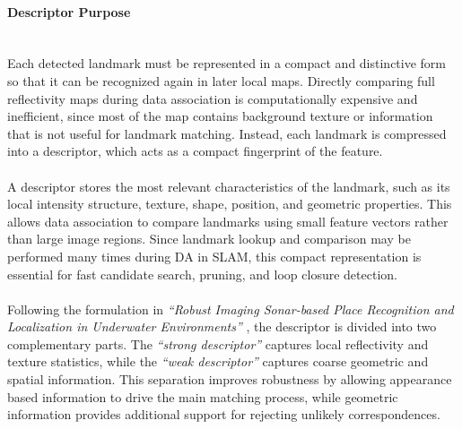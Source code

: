 \paragraph{Descriptor Purpose} \mbox{}\\[0.5em] \noindent
Each detected landmark must be represented in a compact and distinctive form so that it can be recognized again in later local maps. Directly comparing full reflectivity maps during data association is computationally expensive and inefficient, since most of the map contains background texture or information that is not useful for landmark matching. Instead, each landmark is compressed into a descriptor, which acts as a compact fingerprint of the feature.
\\ \\
A descriptor stores the most relevant characteristics of the landmark, such as its local intensity structure, texture, shape, position, and geometric properties. This allows data association to compare landmarks using small feature vectors rather than large image regions. Since landmark lookup and comparison may be performed many times during DA in SLAM, this compact representation is essential for fast candidate search, pruning, and loop closure detection.
\\ \\
Following the formulation in \textit{``Robust Imaging Sonar-based Place Recognition and Localization in Underwater Environments''} \cite{robust_descriptors}, the descriptor is divided into two complementary parts. The \textit{``strong descriptor''} captures local reflectivity and texture statistics, while the \textit{``weak descriptor''} captures coarse geometric and spatial information. This separation improves robustness by allowing appearance based information to drive the main matching process, while geometric information provides additional support for rejecting unlikely correspondences. 


